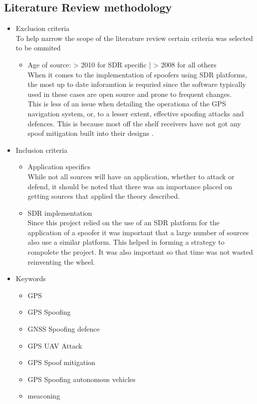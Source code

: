 \subsection{Literature Review methodology}
\begin{itemize}
    \item Exclusion criteria \\ To help narrow the scope of the literature review certain criteria was selected to be ommited
    \begin{itemize}
        \item Age of source: > 2010 for SDR specific | > 2008 for all others \\ When it comes to the implementation of spoofers using SDR platforms, the most up to date inforamtion is requried since the software typically used in these cases are open source and prone to frequent changes.\\ This is less of an issue when detailing the operationa of the GPS navigation system, or, to a lesser extent, effective spoofing attacks and defences. This is because most off the shelf receivers have not got any spoof mitigation built into their designs \cite{RN12}.
    \end{itemize}
    \item Inclusion criteria
    \begin{itemize}
        \item Application specifics \\ While not all sources will have an application, whether to attack or defend, it should be noted that there was an importance placed on getting sources that applied the theory described.
        \item SDR implementation \\ Since this project relied on the use of an SDR platform for the application of a spoofer it was important that a large number of sources also use a similar platform. This helped in forming a strategy to compolete the project. It was also important so that time was not wasted reinventing the wheel.
    \end{itemize}
    \item Keywords
    \begin{itemize}
        \item GPS
        \item GPS Spoofing
        \item GNSS Spoofing defence
        \item GPS UAV Attack
        \item GPS Spoof mitigation
        \item GPS Spoofing autonomous vehicles
        \item meaconing
    \end{itemize}
\end{itemize}

